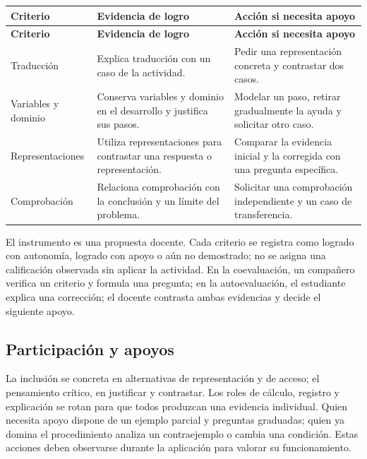 \documentclass[spanish,letterpaper,oneside]{article}
\begin{document}
{\small{}\renewcommand{\arraystretch}{1.25}
\begin{longtable}{|>{\raggedright\arraybackslash}p{}|>{\raggedright\arraybackslash}p{}|>{\raggedright\arraybackslash}p{}|}\hline
\rowcolor{iiiepePale} \textbf{Criterio} & \textbf{Evidencia de logro} & \textbf{Acción si necesita apoyo} \\\hline
\endfirsthead
\hline
\rowcolor{iiiepePale} \textbf{Criterio} & \textbf{Evidencia de logro} & \textbf{Acción si necesita apoyo} \\\hline
\endhead
Traducción & Explica traducción con un caso de la actividad. & Pedir una representación concreta y contrastar dos casos. \\\hline
Variables y dominio & Conserva variables y dominio en el desarrollo y justifica sus pasos. & Modelar un paso, retirar gradualmente la ayuda y solicitar otro caso. \\\hline
Representaciones & Utiliza representaciones para contrastar una respuesta o representación. & Comparar la evidencia inicial y la corregida con una pregunta específica. \\\hline
Comprobación & Relaciona comprobación con la conclusión y un límite del problema. & Solicitar una comprobación independiente y un caso de transferencia. \\\hline
\end{longtable}}
El instrumento es una propuesta docente. Cada criterio se registra como logrado con autonomía, logrado con apoyo o aún no demostrado; no se asigna una calificación observada sin aplicar la actividad. En la coevaluación, un compañero verifica un criterio y formula una pregunta; en la autoevaluación, el estudiante explica una corrección; el docente contrasta ambas evidencias y decide el siguiente apoyo.\subsection{Participación y apoyos}
La inclusión se concreta en alternativas de representación y de acceso; el pensamiento crítico, en justificar y contrastar. Los roles de cálculo, registro y explicación se rotan para que todos produzcan una evidencia individual. Quien necesita apoyo dispone de un ejemplo parcial y preguntas graduadas; quien ya domina el procedimiento analiza un contraejemplo o cambia una condición. Estas acciones deben observarse durante la aplicación para valorar su funcionamiento.
\end{document}
